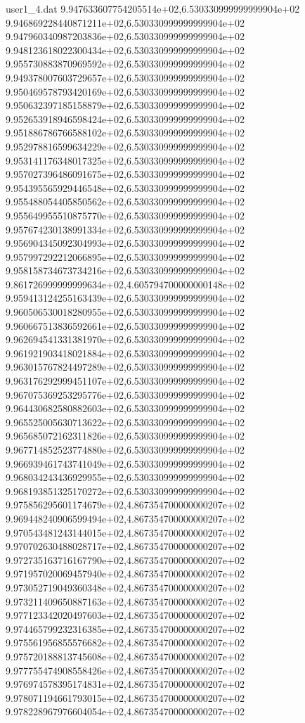 \begin{filecontents}{user1_4.dat}
9.947633607754205514e+02,6.530330999999999904e+02
9.946869228440871211e+02,6.530330999999999904e+02
9.947960340987203836e+02,6.530330999999999904e+02
9.948123618022300434e+02,6.530330999999999904e+02
9.955730883870969592e+02,6.530330999999999904e+02
9.949378007603729657e+02,6.530330999999999904e+02
9.950469578793420169e+02,6.530330999999999904e+02
9.950632397185158879e+02,6.530330999999999904e+02
9.952653918946598424e+02,6.530330999999999904e+02
9.951886786766588102e+02,6.530330999999999904e+02
9.952978816599634229e+02,6.530330999999999904e+02
9.953141176348017325e+02,6.530330999999999904e+02
9.957027396486091675e+02,6.530330999999999904e+02
9.954395565929446548e+02,6.530330999999999904e+02
9.955488054405850562e+02,6.530330999999999904e+02
9.955649955510875770e+02,6.530330999999999904e+02
9.957674230138991334e+02,6.530330999999999904e+02
9.956904345092304993e+02,6.530330999999999904e+02
9.957997292212066895e+02,6.530330999999999904e+02
9.958158734673734216e+02,6.530330999999999904e+02
9.861726999999999634e+02,4.605794700000000148e+02
9.959413124255163439e+02,6.530330999999999904e+02
9.960506530018280955e+02,6.530330999999999904e+02
9.960667513836592661e+02,6.530330999999999904e+02
9.962694541331381970e+02,6.530330999999999904e+02
9.961921903418021884e+02,6.530330999999999904e+02
9.963015767824497289e+02,6.530330999999999904e+02
9.963176292999451107e+02,6.530330999999999904e+02
9.967075369253295776e+02,6.530330999999999904e+02
9.964430682580882603e+02,6.530330999999999904e+02
9.965525005630713622e+02,6.530330999999999904e+02
9.965685072162311826e+02,6.530330999999999904e+02
9.967714852523774880e+02,6.530330999999999904e+02
9.966939461743741049e+02,6.530330999999999904e+02
9.968034243436929955e+02,6.530330999999999904e+02
9.968193851325170272e+02,6.530330999999999904e+02
9.975856295601174679e+02,4.867354700000000207e+02
9.969448240906599494e+02,4.867354700000000207e+02
9.970543481243144015e+02,4.867354700000000207e+02
9.970702630488028717e+02,4.867354700000000207e+02
9.972735163716167790e+02,4.867354700000000207e+02
9.971957020069457940e+02,4.867354700000000207e+02
9.973052719049360348e+02,4.867354700000000207e+02
9.973211409650887163e+02,4.867354700000000207e+02
9.977123342020497603e+02,4.867354700000000207e+02
9.974465799232316385e+02,4.867354700000000207e+02
9.975561956855576682e+02,4.867354700000000207e+02
9.975720188813745608e+02,4.867354700000000207e+02
9.977755474908558426e+02,4.867354700000000207e+02
9.976974578395174831e+02,4.867354700000000207e+02
9.978071194661793015e+02,4.867354700000000207e+02
9.978228967976604054e+02,4.867354700000000207e+02

\end{filecontents}
